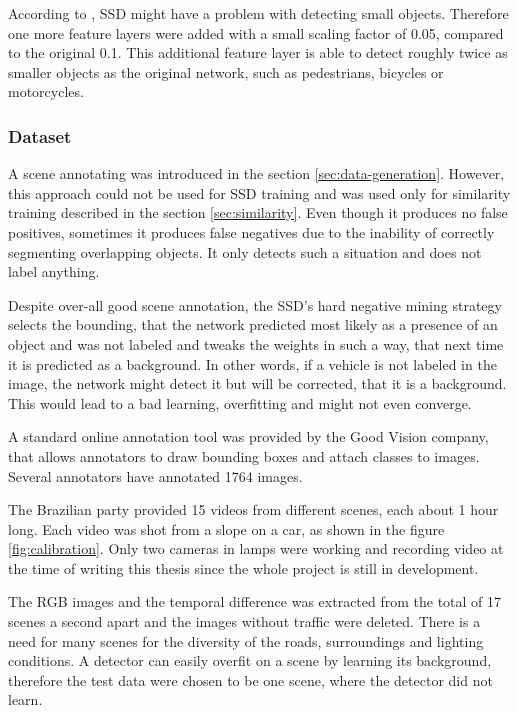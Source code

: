 \documentclass[a4paper,11pt,titlepage,twoside]{article}
\numberwithin{figure}{section}
\begin{document}
According to \cite{cao2018feature}, SSD might have a problem with detecting small objects. Therefore one more feature layers were added with a small scaling factor of 0.05, compared to the original 0.1. This additional feature layer is able to detect roughly twice as smaller objects as the original network, such as pedestrians, bicycles or motorcycles.

\subsubsection{Dataset}
\label{sec:ssd-dataset}
A scene annotating was introduced in the section \ref{sec:data-generation}. However, this approach could not be used for SSD training and was used only for similarity training described in the section \ref{sec:similarity}. Even though it produces no false positives, sometimes it produces false negatives due to the inability of correctly segmenting overlapping objects. It only detects such a situation and does not label anything.

Despite over-all good scene annotation, the SSD's hard negative mining strategy selects the bounding, that the network predicted most likely as a presence of an object and was not labeled and tweaks the weights in such a way, that next time it is predicted as a background. In other words, if a vehicle is not labeled in the image, the network might detect it but will be corrected, that it is a background. This would lead to a bad learning, overfitting and might not even converge.

A standard online annotation tool was provided by the Good Vision company, that allows annotators to draw bounding boxes and attach classes to images. Several annotators have annotated 1764 images.

The Brazilian party provided 15 videos from different scenes, each about 1 hour long. Each video was shot from a slope on a car, as shown in the figure \ref{fig:calibration}. Only two cameras in lamps were working and recording video at the time of writing this thesis since the whole project is still in development. 

The RGB images and the temporal difference was extracted from the total of 17 scenes a second apart and the images without traffic were deleted. There is a need for many scenes for the diversity of the roads, surroundings and lighting conditions. A detector can easily overfit on a scene by learning its background, therefore the test data were chosen to be one scene, where the detector did not learn.
\end{document}
